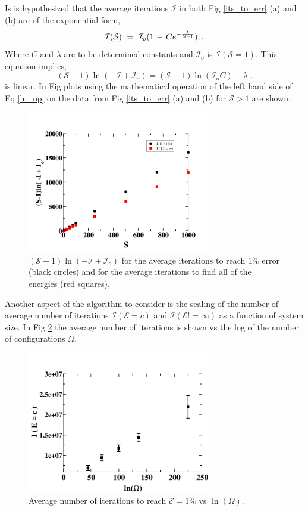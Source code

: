 \documentclass[twocolumn]{article}
\begin{document}
Is is hypothesized that the average iterations $\mathcal{I}$ in both Fig \ref{its_to_err} (a) and (b) are of the exponential form, 
\begin{equation}
\mathcal{I} (\mathcal{S}) \hspace{0.125cm} = \hspace{0.125cm}
 \mathcal{I}_o ( 1 \hspace{0.05cm} - \hspace{0.05cm} Ce^{-  \frac{\lambda}{\mathcal{S}-1}   } ) ;.
\end{equation}
 Where $C$ and $\lambda$ are to be determined constants and $\mathcal{I}_o$ is $\mathcal{I}(\mathcal{S}=1)$. This equation implies, 
 \begin{equation}
 (\mathcal{S}-1)\ln(-\mathcal{I}+ \mathcal{I}_{o}) = (\mathcal{S}-1)\ln(\mathcal{I}_o C) - \lambda \;.
 \label{ln_op}
 \end{equation}
 is linear. In Fig  plots using the mathematical operation of the left hand side of Eq \ref{ln_op} on the data from Fig \ref{its_to_err} (a) and (b) for $\mathcal{S}>1$ are shown. 
\begin{figure}[h!]
\includegraphics[width=8cm]{Tfrm_both.png}
\caption{ $(\mathcal{S}-1 )\ln(-\mathcal{I} + \mathcal{I}_o ) $ for the average iterations to reach  $1\%$ error (black circles) and for the average iterations to find all of the energies (red squares). \label{log_val} }
\end{figure}

  Another aspect of the algorithm to consider is the scaling of the number of average number of iterations $\mathcal{I}(\mathcal{E}=c)$ and $\mathcal{I}(\mathcal{E}!=\infty)$ as a function of system size. In Fig \ref{its_vs_logomega}  the average number of iterations is shown vs the log of the number of configurations $\Omega$. 
\begin{figure}[h!]
\includegraphics[width=8cm]{its_vs_logomega.png}
\caption{\label{its_vs_logomega}Average number of iterations to reach $\mathcal{E}=1\%$ vs  $\ln(\Omega)$. }
\end{figure}
  


\end{document}
